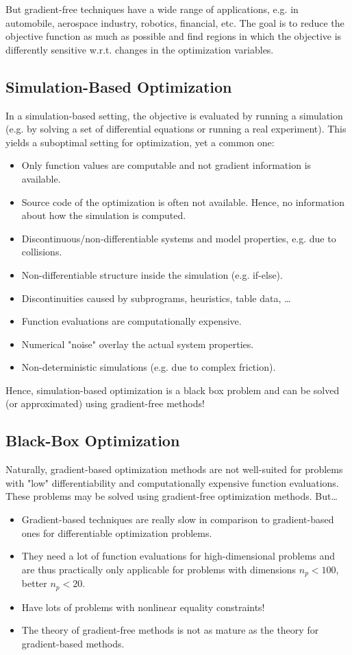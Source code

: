 		But gradient-free techniques have a wide range of applications, e.g. in automobile, aerospace industry, robotics, financial, etc. The goal is to reduce the objective function as much as possible and find regions in which the objective is differently sensitive w.r.t. changes in the optimization variables.

		\subsection{Simulation-Based Optimization}
			In a simulation-based setting, the objective is evaluated by running a simulation (e.g. by solving a set of differential equations or running a real experiment). This yields a suboptimal setting for optimization, yet a common one:
			\begin{itemize}
				\item Only function values are computable and not gradient information is available.
				\item Source code of the optimization is often not available. Hence, no information about how the simulation is computed.
				\item Discontinuous/non-differentiable systems and model properties, e.g. due to collisions.
				\item Non-differentiable structure inside the simulation (e.g. if-else).
				\item Discontinuities caused by subprograms, heuristics, table data, \dots
				\item Function evaluations are computationally expensive.
				\item Numerical "noise" overlay the actual system properties.
				\item Non-deterministic simulations (e.g. due to complex friction).
			\end{itemize}
			Hence, simulation-based optimization is a black box problem and can be solved (or approximated) using gradient-free methods!

		\subsection{Black-Box Optimization}
			Naturally, gradient-based optimization methods are not well-suited for problems with "low" differentiability and computationally expensive function evaluations. These problems may be solved using gradient-free optimization methods. But\dots
			\begin{itemize}
				\item Gradient-based techniques are really slow in comparison to gradient-based ones for differentiable optimization problems.
				\item They need a lot of function evaluations for high-dimensional problems and are thus practically only applicable for problems with dimensions \( n_p < 100 \), better \( n_p < 20 \).
				\item Have lots of problems with nonlinear equality constraints!
				\item The theory of gradient-free methods is not as mature as the theory for gradient-based methods.
			\end{itemize}

